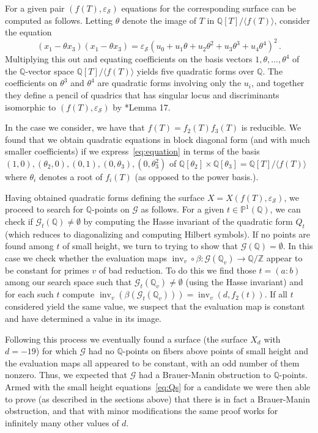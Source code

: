 \documentclass[12pt, reqno]{amsart}
\theoremstyle{definition}
\newcommand{\PP}{{\mathbb P}}
\newcommand{\Q}{{\mathbb Q}}
\newcommand{\Z}{{\mathbb Z}}
\newcommand{\calG}{{\mathcal G}}
\newcommand{\scrS}{{\mathscr S}}
\DeclareMathOperator{\inv}{inv}
\newcommand{\eps}{\varepsilon}
\begin{document}
For a given pair $(f(T),\eps_{\scrS})$ equations for the corresponding surface can be computed as follows. Letting $\theta$ denote the image of $T$ in $\Q[T]/\langle f(T)\rangle$, consider the equation
	\begin{equation}\label{eq:equation}
	(x_1 - \theta x_3)(x_1-\theta x_3) = \eps_{\scrS}(u_0 + u_1\theta + u_2\theta^2 + u_3\theta^3 + u_4\theta^4)^2\,.
	\end{equation}
	Multiplying this out and equating coefficients on the basis vectors $1,\theta,\dots,\theta^4$ of the $\Q$-vector space $\Q[T]/\langle f(T)\rangle$ yields five quadratic forms over $\Q$. The coefficients on $\theta^3$ and $\theta^4$ are quadratic forms involving only the $u_i$, and together they define a pencil of quadrics that has singular locus and discriminants isomorphic to $(f(T),\eps_{\scrS})$ by \cite{BBFL}*{Lemma 17}. 
	
	In the case we consider, we have that $f(T)=f_2(T)f_3(T)$ is reducible. We found that we obtain quadratic equations in block diagonal form (and with much smaller coefficients) if we express~\eqref{eq:equation} in terms of the basis $(1,0),(\theta_2,0),(0,1),(0,\theta_3),(0,\theta_3^2)$ of $\Q[\theta_2]\times \Q[\theta_3] = \Q[T]/\langle f(T) \rangle$ where $\theta_i$ denotes a root of  $f_i(T)$ (as opposed to the power basis.). 
	
	Having obtained quadratic forms defining the surface $X = X(f(T),\eps_{\scrS})$, we proceed to search for \(\Q\)-points on $\calG$ as follows. For a given $t \in \PP^1(\Q)$, we can check if $\calG_t(\Q) \ne \emptyset$ by computing the Hasse invariant of the quadratic form $Q_t$ (which reduces to 
   diagonalizing and computing Hilbert symbols). If no points are found among $t$ of small height, we turn to trying to show that $\calG(\Q) = \emptyset$. In this case we check whether the evaluation maps $\inv_v\circ \beta \colon \calG(\Q_v) \to \Q/\Z$ appear to be constant for primes $v$ of bad reduction. To do this we find those $t = (a:b)$ among our search space such that $\calG_t(\Q_v) \ne \emptyset$ (using the Hasse invariant) and for each such $t$ compute $\inv_v(\beta(\calG_t(\Q_v))) = \inv_v(d,f_2(t))$. If all $t$ considered yield the same value, we suspect that the evaluation map is constant and have determined a value in its image.
	
	Following this process we eventually found a surface (the surface $X_d$ with $d = -19$) for which $\calG$ had no $\Q$-points on fibers above points of small height and the evaluation maps all appeared to be constant, with an odd number of them nonzero. Thus, we expected that $\calG$ had a Brauer-Manin obstruction to $\Q$-points. Armed with the small height equations~\eqref{eq:Qs} for a candidate we were then able to prove (as described in the sections above) that there is in fact a Brauer-Manin obstruction, and that with minor modifications the same proof works for infinitely many other values of $d$. 
\end{document}
